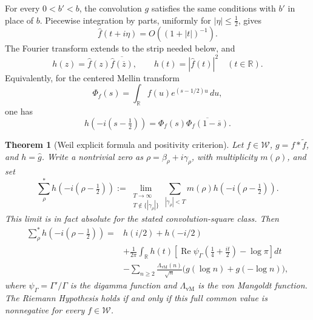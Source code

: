 \documentclass[11pt]{article}
\theoremstyle{plain}
\newtheorem{theorem}{Theorem}[section]
\theoremstyle{definition}
\theoremstyle{remark}
\newcommand{\vmLambda}{\Lambda_{\mathrm{vM}}}
\newcommand{\psiGamma}{\psi_{\Gamma}}
\begin{document}
For every \(0<b'<b\), the convolution \(g\) satisfies the same conditions
with \(b'\) in place of \(b\).  Piecewise integration by parts, uniformly
for \(|\eta|\leq\tfrac12\), gives
\[
 \widehat f(t+i\eta)=O((1+|t|)^{-1}).
\]
The Fourier transform extends to the strip needed below, and
\[
 h(z)=\widehat f(z)\overline{\widehat f(\overline z)},
 \qquad h(t)=|\widehat f(t)|^2\quad(t\in\mathbb R).
\]
Equivalently, for the centered Mellin transform
\[
 \Phi_f(s)=\int_{\mathbb R}f(u)e^{(s-1/2)u}\,du,
\]
one has
\[
 h\!\left(-i(s-\tfrac12)\right)
 =\Phi_f(s)\overline{\Phi_f(1-\overline s)}.
\]

\begin{theorem}[Weil explicit formula and positivity criterion]
\label{thm:weil}
Let \(f\in\mathcal W\), \(g=f*\widetilde f\), and
\(h=\widehat g\).  Write a nontrivial zero as
\(\rho=\beta_\rho+i\gamma_\rho\), with multiplicity \(m(\rho)\), and set
\[
 \sum_\rho^{*}h\!\left(-i(\rho-\tfrac12)\right)
 :=\lim_{\substack{T\to\infty\\
                    T\notin\{|\gamma_\rho|\}}}
 \sum_{|\gamma_\rho|<T}m(\rho)
 h\!\left(-i(\rho-\tfrac12)\right).
\]
This limit is in fact absolute for the stated convolution-square class.
Then
\[
\begin{aligned}
 \sum_\rho^{*}h\!\left(-i(\rho-\tfrac12)\right)
 ={}&h(i/2)+h(-i/2)\\
 &+\frac1{2\pi}\int_{\mathbb R}h(t)
 \left[\operatorname{Re}\psiGamma\!\left(\frac14+\frac{it}{2}\right)
 -\log\pi\right]dt\\
 &-\sum_{n\geq2}\frac{\vmLambda(n)}{\sqrt n}
 \bigl(g(\log n)+g(-\log n)\bigr),
\end{aligned}
\]
where \(\psiGamma=\Gamma'/\Gamma\) is the digamma function and
\(\vmLambda\) is the von Mangoldt function.  The Riemann Hypothesis
holds if and only if this full common value is nonnegative for every
\(f\in\mathcal W\).
\end{theorem}
\end{document}
